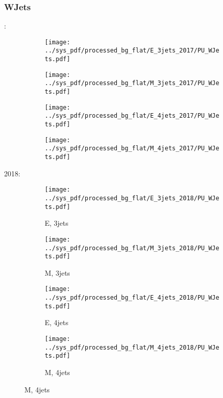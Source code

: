\documentclass{beamer}
\begin{document}
\begin{frame}
\frametitle{WJets}
\fontsize{5}{1}:
\begin{figure}
\centering
\begin{subfigure}[b]{0.24\textwidth}
\texttt{[image: ../sys\_pdf/processed\_bg\_flat/E\_3jets\_2017/PU\_WJets.pdf]}
\end{subfigure}
\begin{subfigure}[b]{0.24\textwidth}
\texttt{[image: ../sys\_pdf/processed\_bg\_flat/M\_3jets\_2017/PU\_WJets.pdf]}
\end{subfigure}
\begin{subfigure}[b]{0.24\textwidth}
\texttt{[image: ../sys\_pdf/processed\_bg\_flat/E\_4jets\_2017/PU\_WJets.pdf]}
\end{subfigure}
\begin{subfigure}[b]{0.24\textwidth}
\texttt{[image: ../sys\_pdf/processed\_bg\_flat/M\_4jets\_2017/PU\_WJets.pdf]}
\end{subfigure}
\end{figure}
2018:
\begin{figure}
\centering
\begin{subfigure}[b]{0.24\textwidth}
\texttt{[image: ../sys\_pdf/processed\_bg\_flat/E\_3jets\_2018/PU\_WJets.pdf]}
\captionsetup{font=tiny}
\caption{E, 3jets}
\end{subfigure}
\begin{subfigure}[b]{0.24\textwidth}
\texttt{[image: ../sys\_pdf/processed\_bg\_flat/M\_3jets\_2018/PU\_WJets.pdf]}
\captionsetup{font=tiny}
\caption{M, 3jets}
\end{subfigure}
\begin{subfigure}[b]{0.24\textwidth}
\texttt{[image: ../sys\_pdf/processed\_bg\_flat/E\_4jets\_2018/PU\_WJets.pdf]}
\captionsetup{font=tiny}
\caption{E, 4jets}
\end{subfigure}
\begin{subfigure}[b]{0.24\textwidth}
\texttt{[image: ../sys\_pdf/processed\_bg\_flat/M\_4jets\_2018/PU\_WJets.pdf]}
\captionsetup{font=tiny}
\caption{M, 4jets}
\end{subfigure}
\end{figure}
\end{frame}
\end{document}
